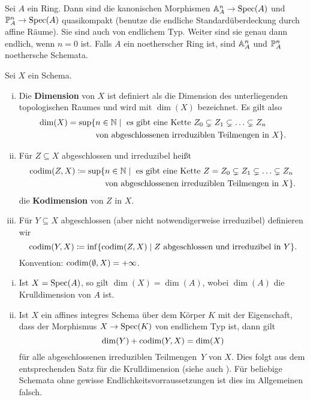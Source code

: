 \begin{bsp}
\label{bsp:6.12}
	Sei $A$ ein Ring. Dann sind die kanonischen Morphismen $\A^n_A \to \Spec(A)$ und $\P^n_A\to\Spec(A)$ quasikompakt (benutze die endliche Standardüberdeckung durch affine Räume). Sie sind auch von endlichem Typ. Weiter sind sie genau dann endlich, wenn $n = 0$ ist. Falls $A$ ein noetherscher Ring ist, sind $\A_A^n$ und $\P_A^n$ noethersche Schemata.
\end{bsp}

\begin{defn}
\label{defn:6.13}
	Sei $X$ ein Schema.
	\begin{enumerate}[i)]
		\item Die \textbf{Dimension} von $X$ ist definiert als die Dimension des unterliegenden topologischen Raumes und wird mit $\dim(X)$ bezeichnet. Es gilt also
		\begin{align*}
			\dim(X) = \sup\{&n \in \N \mid \text{ es gibt eine Kette }Z_0 \subsetneq Z_1 \subsetneq \ldots \subsetneq Z_n\\
			&\text{von abgeschlossenen irreduziblen Teilmengen in }X\}.
		\end{align*}
		\item Für $Z \subseteq X$ abgeschlossen und irreduzibel heißt
		\begin{align*}
			\codim(Z,X) \coloneqq \sup\{&n \in \N \mid \text{ es gibt eine Kette } Z = Z_0 \subsetneq Z_1 \subsetneq \ldots \subsetneq Z_n\\
			&\text{von abgeschlossenen irreduziblen Teilmengen in }X\}.
		\end{align*}
		die \textbf{Kodimension} von $Z$ in $X$.
		\item Für $Y\subseteq X$ abgeschlossen (aber nicht notwendigerweise irreduzibel) definieren wir
		\[
			\codim(Y,X) \coloneqq \inf\{\codim(Z,X) \mid Z \text{ abgeschlossen und irreduzibel in } Y\}.
		\]
		Konvention: $\codim(\emptyset,X) = +\infty$.
	\end{enumerate}	
\end{defn}

\begin{bem}
\label{bem:6.14}
	\begin{enumerate}[i)]
		\item Ist $X = \Spec(A)$, so gilt $\dim(X) = \dim(A)$, wobei $\dim(A)$ die Krulldimension von $A$ ist.
		\item Ist $X$ ein affines integres Schema über dem Körper $K$ mit der Eigenschaft, dass der Morphismus $X \to \Spec(K)$ von endlichem Typ ist, dann gilt
		\[
			\dim(Y) + \codim(Y,X) = \dim(X)
		\]
		für alle abgeschlossenen irreduziblen Teilmengen~$Y$ von $X$. Dies folgt aus dem entsprechenden Satz für die Krulldimension (siehe auch \cite[Chapter5, §14]{matsumura1970commutative}). Für beliebige Schemata ohne gewisse Endlichkeitsvorraussetzungen ist dies im Allgemeinen falsch.
	\end{enumerate}
\end{bem}

